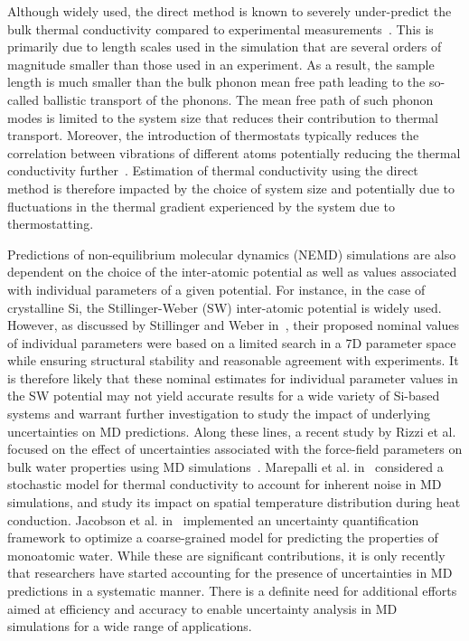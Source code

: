 Although widely used, the direct method is known to severely under-predict
the bulk thermal conductivity compared to experimental 
measurements~\cite{Haynes:2014,Shanks:1963}. This is primarily
due to length scales used in the simulation that are several orders of magnitude smaller
than those used in an experiment. As a result, the sample length is much smaller than the
bulk phonon mean free path leading to the so-called ballistic transport of the phonons.
The mean free path of such phonon modes is limited to the system size that reduces their
contribution to thermal transport. Moreover, the
introduction of thermostats typically reduces the correlation between vibrations of 
different atoms potentially reducing the thermal conductivity
further~\cite{Evans:2008}. Estimation of thermal conductivity using the
direct method is therefore impacted by the choice of system size and potentially due to
fluctuations in the thermal gradient experienced by the system due to thermostatting.  

Predictions of non-equilibrium molecular dynamics (NEMD) simulations are also dependent on the
choice of the inter-atomic potential as well as values associated with individual parameters
of a given potential. For instance, in the case of crystalline Si, the Stillinger-Weber (SW)
inter-atomic potential is widely used. However, as discussed by Stillinger and Weber
in~\cite{Stillinger:1985}, their proposed nominal values of individual parameters were based
on a limited search in a 7D parameter space while ensuring structural stability and
reasonable agreement with experiments. It is therefore likely that these nominal estimates
for individual parameter values in the SW potential may not yield accurate results for a
wide variety of Si-based systems and warrant further investigation to study the impact of
underlying uncertainties on MD predictions. Along these lines, 
a recent study by Rizzi et al. focused on the effect of
uncertainties associated with the force-field parameters on bulk water properties using MD
simulations~\cite{Rizzi:2012}. Marepalli et al. in~\cite{Marepalli:2014} considered a stochastic model
for thermal conductivity to account for inherent noise in MD simulations, and study its impact on
spatial temperature 
distribution during heat conduction. Jacobson et al. in~\cite{Jacobson:2014} implemented an uncertainty
quantification framework to optimize a coarse-grained model for predicting the properties of monoatomic
 water. While these are significant contributions, it is only recently 
that researchers have started accounting for the presence of uncertainties in MD predictions in a
systematic manner. There is a definite need for additional efforts aimed at efficiency and accuracy
to enable uncertainty analysis in MD simulations for a wide range of applications.

